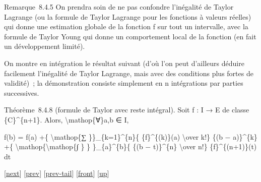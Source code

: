 \documentclass[]{article}
\begin{document}
Remarque~8.4.5 On prendra soin de ne pas confondre l'inégalité de Taylor
Lagrange (ou la formule de Taylor Lagrange pour les fonctions à valeurs
réelles) qui donne une estimation globale de la fonction f sur tout un
intervalle, avec la formule de Taylor Young qui donne un comportement
local de la fonction (en fait un développement limité).

On montre en intégration le résultat suivant (d'où l'on peut d'ailleurs
déduire facilement l'inégalité de Taylor Lagrange, mais avec des
conditions plus fortes de validité)~; la démonstration consiste
simplement en n intégrations par parties successives.

Théorème~8.4.8 (formule de Taylor avec reste intégral). Soit f : I → E
de classe \{C\}\^{}\{n+1\}. Alors, \textbackslash{}mathop\{∀\}a,b ∈ I,

f(b) = f(a) +\{ \textbackslash{}mathop\{∑ \}\}\_\{k=1\}\^{}\{n\}\{
\{f\}\^{}\{(k)\}(a) \textbackslash{}over k!\} \{(b − a)\}\^{}\{k\} +\{
\textbackslash{}mathop\{\textbackslash{}mathop\{∫ \} \}
\}\_\{a\}\^{}\{b\}\{ \{(b − t)\}\^{}\{n\} \textbackslash{}over n!\}
\{f\}\^{}\{(n+1)\}(t) dt

{[}\href{coursse48.html}{next}{]} {[}\href{coursse46.html}{prev}{]}
{[}\href{coursse46.html\#tailcoursse46.html}{prev-tail}{]}
{[}\href{coursse47.html}{front}{]}
{[}\href{coursch9.html\#coursse47.html}{up}{]}
\end{document}
